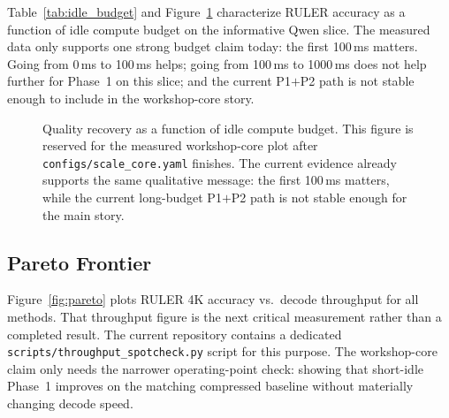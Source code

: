 \documentclass[10pt,twocolumn,letterpaper]{article}
\begin{document}
Table~\ref{tab:idle_budget} and Figure~\ref{fig:budget_curve} characterize
RULER accuracy as a function of idle compute budget on the informative Qwen
slice.
The measured data only supports one strong budget claim today:
the first 100\,ms matters.
Going from 0\,ms to 100\,ms helps; going from 100\,ms to 1000\,ms does not
help further for Phase~1 on this slice; and the current P1$+$P2 path is not
stable enough to include in the workshop-core story.

\begin{table}[t]
\centering
\caption{Measured Qwen RULER-4K budget sweep on the informative $r{=}0.7$
slice. The first 100\,ms carries the durable Phase~1 signal.}
\label{tab:idle_budget}
\end{table}

\begin{figure}[t]
\centering
{}
\caption{Quality recovery as a function of idle compute budget.
This figure is reserved for the measured workshop-core plot after
\texttt{configs/scale\_core.yaml} finishes. The current evidence already supports the
same qualitative message: the first 100\,ms matters, while the current
long-budget P1$+$P2 path is not stable enough for the main story.}
\label{fig:budget_curve}
\end{figure}

\subsection{Pareto Frontier}

Figure~\ref{fig:pareto} plots RULER 4K accuracy vs.\ decode throughput for all
methods.
That throughput figure is the next critical measurement rather than a completed
result. The current repository contains a dedicated
\texttt{scripts/throughput\_spotcheck.py} script for this purpose.
The workshop-core claim only needs the narrower operating-point check:
showing that short-idle Phase~1 improves on the matching compressed baseline
without materially changing decode speed.
\end{document}
